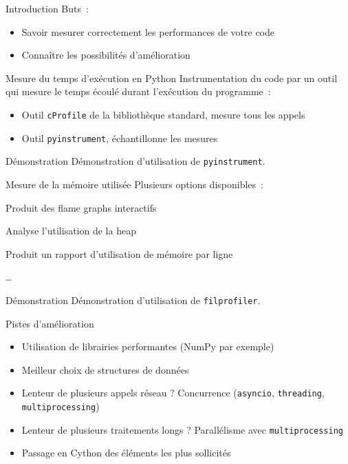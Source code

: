 \begin{frame}{Introduction}
  Buts~:
  \begin{itemize}[<+->]
    \item Savoir mesurer correctement les performances de votre code
    \item Connaître les possibilités d'amélioration
  \end{itemize}
\end{frame}

\begin{frame}{Mesure du temps d'exécution en Python}
  Instrumentation du code par un outil qui mesure le temps écoulé durant l'exécution du programme~:
  \begin{itemize}[<+->]
    \item Outil \texttt{cProfile} de la bibliothèque standard, mesure tous les appels
    \item Outil \texttt{pyinstrument}, échantillonne les mesures
  \end{itemize}
\end{frame}

\begin{frame}{Démonstration}
  Démonstration d'utilisation de \texttt{pyinstrument}.
\end{frame}

\begin{frame}{Mesure de la mémoire utilisée}
  Plusieurs options disponibles~:

  \begin{description}[<+->]
    \item[\texttt{filprofiler}] Produit des flame graphs interactifs
    \item[\texttt{Guppy3}] Analyse l'utilisation de la heap
    \item[memory\_profiler] Produit un rapport d'utilisation de mémoire par ligne
    \item …
  \end{description}
\end{frame}

\begin{frame}{Démonstration}
  Démonstration d'utilisation de \texttt{filprofiler}.
\end{frame}

\begin{frame}{Pistes d'amélioration}
  \begin{itemize}[<+->]
    \item Utilisation de librairies performantes (NumPy par exemple)
    \item Meilleur choix de structures de données
    \item Lenteur de plusieurs appels réseau ? Concurrence (\texttt{asyncio}, \texttt{threading}, \texttt{multiprocessing})
    \item Lenteur de plusieurs traitements longs ? Parallélisme avec \texttt{multiprocessing}
    \item Passage en Cython des éléments les plus sollicités
  \end{itemize}
\end{frame}
